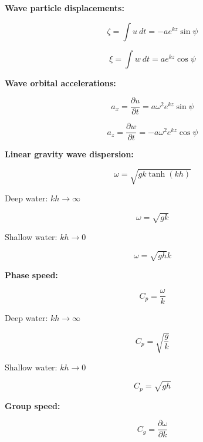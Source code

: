 \documentclass[12pt]{article}
\numberwithin{equation}{section}
\numberwithin{figure}{section}
\numberwithin{table}{section}
\begin{document}
\textbf{Wave particle displacements:}

\begin{equation}
  \zeta = \int u\ dt = - a e^{kz} \sin\psi
\end{equation}

\begin{equation}
  \xi = \int w\ dt = a e^{kz} \cos\psi
\end{equation}

\textbf{Wave orbital accelerations:}

\begin{equation}
  a_x = \frac{\partial u}{\partial t} = a \omega^2 e^{kz} \sin\psi
\end{equation}

\begin{equation}
  a_z = \frac{\partial w}{\partial t} = - a \omega^2 e^{kz} \cos\psi
\end{equation}

\textbf{Linear gravity wave dispersion:}

\begin{equation}
  \omega = \sqrt{g k \tanh(kh)}
\end{equation}

Deep water: $kh \to \infty$

\begin{equation}
  \omega = \sqrt{g k}
\end{equation}

Shallow water: $kh \to 0$

\begin{equation}
  \omega = \sqrt{gh} k
\end{equation}

\textbf{Phase speed:}

\begin{equation}
  C_p = \frac{\omega}{k}
\end{equation}

Deep water: $kh \to \infty$

\begin{equation}
  C_p = \sqrt{\frac{g}{k}}
\end{equation}

Shallow water: $kh \to 0$

\begin{equation}
  C_p = \sqrt{gh}
\end{equation}

\textbf{Group speed:}

\begin{equation}
  C_g = \frac{\partial \omega}{\partial k}
\end{equation}
\end{document}
